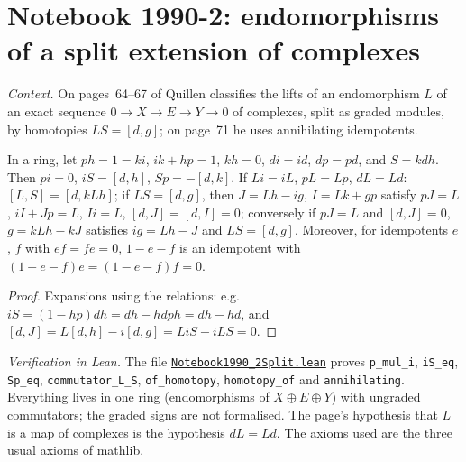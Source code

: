 \section[Notebook 1990-2: endomorphisms of a split extension]{Notebook 1990-2: endomorphisms of a split extension of complexes\protect{}}\label{sec:quillen-1990-2-split}

\emph{Context.} On pages~64--67 of  Quillen classifies the lifts of an endomorphism $L$ of an exact sequence $0 \to X \to E \to Y \to 0$ of complexes, split as graded modules, by homotopies $LS = [d, g]$; on page~71 he uses annihilating idempotents.

\begin{encadre}
\begin{theoreme}\label{thm:quillen-1990-2-split}
In a ring, let $ph = 1 = ki$, $ik + hp = 1$, $kh = 0$, $di = id$, $dp = pd$, and $S = kdh$. Then $pi = 0$, $iS = [d, h]$, $Sp = -[d, k]$. If $Li = iL$, $pL = Lp$, $dL = Ld$: $[L, S] = [d, kLh]$; if $LS = [d, g]$, then $J = Lh - ig$, $I = Lk + gp$ satisfy $pJ = L$, $iI + Jp = L$, $Ii = L$, $[d, J] = [d, I] = 0$; conversely if $pJ = L$ and $[d, J] = 0$, $g = kLh - kJ$ satisfies $ig = Lh - J$ and $LS = [d, g]$. Moreover, for idempotents $e$, $f$ with $ef = fe = 0$, $1 - e - f$ is an idempotent with $(1 - e - f)e = (1 - e - f)f = 0$.
\end{theoreme}
\end{encadre}

\begin{proof}
Expansions using the relations: e.g. $iS = (1 - hp)dh = dh - hdph = dh - hd$, and $[d, J] = L[d, h] - i[d, g] = LiS - iLS = 0$.
\end{proof}

\emph{Verification in Lean.} The file \href{\leanblobmain/Notebook1990_2Split.lean}{\texttt{Notebook1990\_2Split.\allowbreak{}lean}} proves \texttt{p\_mul\_i}, \texttt{iS\_eq}, \texttt{Sp\_eq}, \texttt{commutator\_L\_S}, \texttt{of\_homotopy}, \texttt{homotopy\_of} and \texttt{annihilating}. Everything lives in one ring (endomorphisms of $X \oplus E \oplus Y$) with ungraded commutators; the graded signs are not formalised. The page's hypothesis that $L$ is a map of complexes is the hypothesis $dL = Ld$. The axioms used are the three usual axioms of mathlib.

